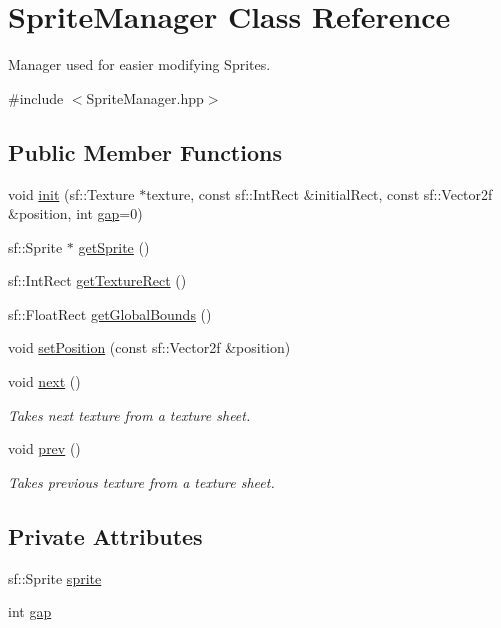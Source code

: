 \hypertarget{class_sprite_manager}{}\section{Sprite\+Manager Class Reference}
\label{class_sprite_manager}


Manager used for easier modifying Sprites.  




{\ttfamily \#include $<$Sprite\+Manager.\+hpp$>$}

\subsection*{Public Member Functions}
\begin{DoxyCompactItemize}
\item 
void \mbox{\hyperlink{class_sprite_manager_a6bc9f6b77d54099de6fcf84ec1e360bd}{init}} (sf\+::\+Texture $\ast$texture, const sf\+::\+Int\+Rect \&initial\+Rect, const sf\+::\+Vector2f \&position, int \mbox{\hyperlink{class_sprite_manager_a57bba66a27411c59651af826b50ec11d}{gap}}=0)
\item 
sf\+::\+Sprite $\ast$ \mbox{\hyperlink{class_sprite_manager_a9c0af555f22c9ea83a07ae3d1818db0e}{get\+Sprite}} ()
\item 
sf\+::\+Int\+Rect \mbox{\hyperlink{class_sprite_manager_af51994d0f3a5e847a8c55bb022f8b1e2}{get\+Texture\+Rect}} ()
\item 
sf\+::\+Float\+Rect \mbox{\hyperlink{class_sprite_manager_af4b1373fb34c1bf091e5023fe52c1bc0}{get\+Global\+Bounds}} ()
\item 
void \mbox{\hyperlink{class_sprite_manager_a9ef427743db56baec20673d877a63717}{set\+Position}} (const sf\+::\+Vector2f \&position)
\item 
void \mbox{\hyperlink{class_sprite_manager_acdcd181f96ed049db0bf445a71e4b6e2}{next}} ()
\begin{DoxyCompactList}\small\item\em Takes next texture from a texture sheet. \end{DoxyCompactList}\item 
void \mbox{\hyperlink{class_sprite_manager_a45d2b2613bb95d34ce8e0ad28e261ef1}{prev}} ()
\begin{DoxyCompactList}\small\item\em Takes previous texture from a texture sheet. \end{DoxyCompactList}\end{DoxyCompactItemize}
\subsection*{Private Attributes}
\begin{DoxyCompactItemize}
\item 
sf\+::\+Sprite \mbox{\hyperlink{class_sprite_manager_aaa4c24e6db93bef8a28b38cb8de839c1}{sprite}}
\item 
int \mbox{\hyperlink{class_sprite_manager_a57bba66a27411c59651af826b50ec11d}{gap}}
\end{DoxyCompactItemize}


